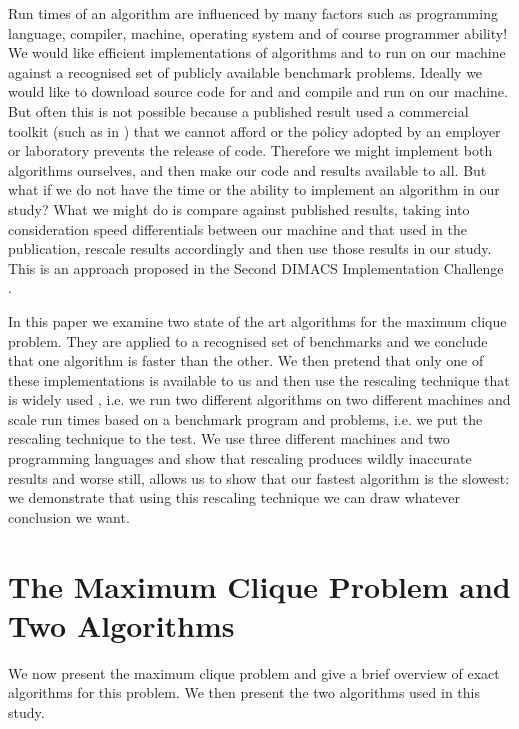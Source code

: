 \documentclass[runningheads]{llncs}
\begin{document}
Run times of an algorithm are influenced by many factors such as programming language, compiler, machine, operating system
and of course programmer ability! We would like efficient implementations of algorithms  and  to run on our machine 
against a recognised set of publicly available benchmark problems. Ideally we would like to download source code for  and 
and compile and run on our machine. 
But often this is not possible because a published result used 
a commercial toolkit (such as in \cite{regin2003}) that we cannot afford or the policy adopted by an employer or laboratory
prevents the release of code. Therefore we might implement both algorithms ourselves, and then
make our code and results available to all. 
But what if we do not have the time or the ability to implement an algorithm in our study?
What we might do is compare against published results, taking into consideration speed differentials between our machine and that used in the 
publication, rescale results accordingly and then use those results in our study. This is an approach proposed in the Second DIMACS Implementation Challenge \cite{dimacs93}.



In this paper we examine two state of the art algorithms for the maximum clique problem. They are applied to a recognised 
set of benchmarks and we conclude that one algorithm is faster than the other. We then pretend that only
one of these implementations is available to us and then use the rescaling technique that is widely used \cite{dimacs93}, i.e.
we run two different algorithms on two different machines and scale run times based on a benchmark program and problems, i.e. we put the rescaling technique
to the test. We use three different machines and two programming languages and show that rescaling produces wildly inaccurate results and worse still,
allows us to show that our fastest algorithm is the slowest: we demonstrate that using this
rescaling technique we can draw whatever conclusion we want.

\section{The Maximum Clique Problem and Two Algorithms}
\vspace{-1.5mm}
We now present the maximum clique problem and give a brief overview of exact algorithms for this problem. We then present 
the two algorithms used in this study.
\end{document}
